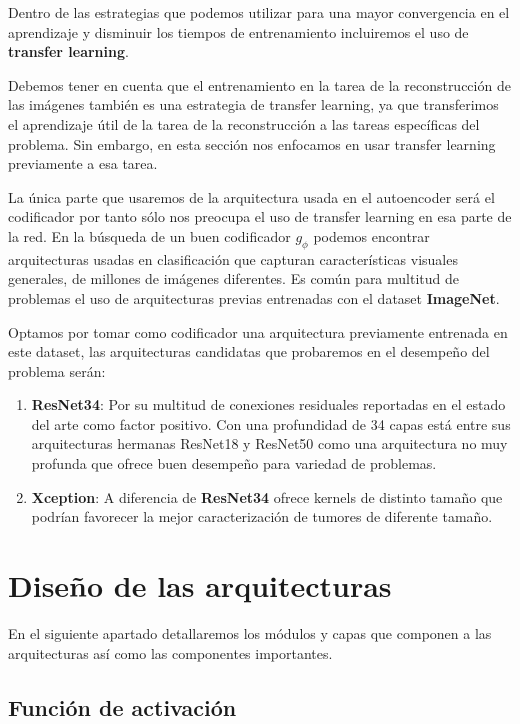 Dentro de las estrategias que podemos utilizar para una mayor convergencia en el aprendizaje y disminuir los tiempos de entrenamiento incluiremos el uso de \textbf{transfer learning}.

Debemos tener en cuenta que el entrenamiento en la tarea de la reconstrucción de las imágenes también es una estrategia de transfer learning, ya que transferimos el aprendizaje útil de la tarea de la reconstrucción a las tareas específicas del problema. Sin embargo, en esta sección nos enfocamos en usar transfer learning previamente a esa tarea. 

La única parte que usaremos de la arquitectura usada en el autoencoder será el codificador por tanto sólo nos preocupa el uso de transfer learning en esa parte de la red. En la búsqueda de un buen codificador $g_{\phi}$ podemos encontrar arquitecturas usadas en clasificación que capturan características visuales generales, de millones de imágenes diferentes. Es común para multitud de problemas el uso de arquitecturas previas entrenadas con el dataset \textbf{ImageNet}. 

Optamos por tomar como codificador una arquitectura previamente entrenada en este dataset, las arquitecturas candidatas que probaremos en el desempeño del problema serán: 

\begin{enumerate}
	\item \textbf{ResNet34}: Por su multitud de conexiones residuales reportadas en el estado del arte como factor positivo. Con una profundidad de 34 capas está entre sus arquitecturas hermanas ResNet18 y ResNet50 como una arquitectura no muy profunda que ofrece buen desempeño para variedad de problemas.
	
	\item \textbf{Xception}: A diferencia de \textbf{ResNet34} ofrece kernels de distinto tamaño que podrían favorecer la mejor caracterización de tumores de diferente tamaño. 
	
\end{enumerate}


\section{Diseño de las arquitecturas}

En el siguiente apartado detallaremos los módulos y capas que componen a las arquitecturas así como las componentes importantes. 

\subsection{Función de activación}

